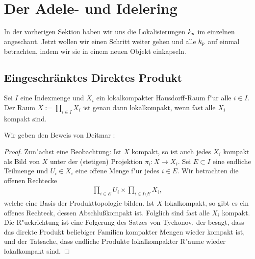 \section{Der Adele- und Idelering}
	In der vorherigen Sektion haben wir uns die Lokalisierungen $k_p$ im einzelnen angeschaut. Jetzt wollen wir einen Schritt weiter gehen und alle $k_p$ auf einmal betrachten, indem wir sie in einem neuen Objekt einkapseln.
	\subsection{Eingeschränktes Direktes Produkt}
		\begin{lemma}\label{Lemma:lokalkompaktProd}
			Sei $I$ eine Indexmenge und $X_i$ ein lokalkompakter Hausdorff-Raum f"ur alle $i \in I$. Der Raum $X:=\prod_{i \in I} X_i$ ist genau dann lokalkompakt, wenn fast alle $X_i$ kompakt sind.
		\end{lemma}
		Wir geben den Beweis von Deitmar \cite{deitmar2010}:
		\begin{proof}
			Zun"achst eine Beobachtung: Ist $X$ kompakt, so ist auch jedes $X_i$ kompakt als Bild von $X$ unter der (stetigen) Projektion $\pi_i:X \to X_i$.
			Sei $E \subset I$ eine endliche Teilmenge und $U_i \in X_i$ eine offene Menge f"ur jedes $i \in E$. Wir betrachten die offenen Rechtecke
			\begin{align*}
				\prod_{i \in E} U_i \times \prod_{i \in I\setminus E} X_i,
			\end{align*}
			welche eine Basis der Produkttopologie bilden. Ist $X$ lokalkompakt, so gibt es ein offenes Rechteck, dessen Abschlu\ss kompakt ist. Folglich sind fast alle $X_i$ kompakt. Die R"uckrichtung ist eine Folgerung des Satzes von Tychonov, der besagt, dass das direkte Produkt beliebiger Familien kompakter Mengen wieder kompakt ist, und der Tatsache, dass endliche Produkte lokalkompakter R"aume wieder lokalkompakt sind.
		\end{proof}
		
